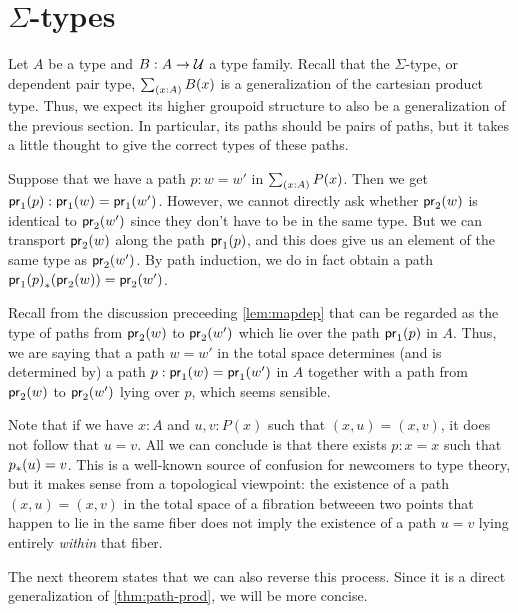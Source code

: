 \section{\texorpdfstring{$\Sigma$}{Σ}-types}
\label{sec:compute-sigma}

Let $A$ be a type and $B:A\to\mathcal{U}$ a type family.
Recall that the $\Sigma$-type, or dependent pair type, $\sm{x:A} B(x)$ is a generalization of the cartesian product type.
Thus, we expect its higher groupoid structure to also be a generalization of the previous section.
In particular, its paths should be pairs of paths, but it takes a little thought to give the correct types of these paths.

Suppose that we have a path $p:w=w'$ in $\sm{x:A}P(x)$.
Then we get ${\mathsf{pr}_{1}}\mathopen{}\left({p}\right)\mathclose{}:\mathsf{pr}_{1}(w)=\mathsf{pr}_{1}(w')$.
However, we cannot directly ask whether $\mathsf{pr}_{2}(w)$ is identical to $\mathsf{pr}_{2}(w')$ since they don't have to be in the same type.
But we can transport $\mathsf{pr}_{2}(w)$ along the path ${\mathsf{pr}_{1}}\mathopen{}\left({p}\right)\mathclose{}$, and this does give us an element of the same type as $\mathsf{pr}_{2}(w')$.
By path induction, we do in fact obtain a path ${{\mathsf{pr}_{1}}\mathopen{}\left({p}\right)\mathclose{}}_{*}\mathopen{}\left({\mathsf{pr}_{2}(w)}\right)\mathclose{}=\mathsf{pr}_{2}(w')$.

Recall from the discussion preceeding \autoref{lem:mapdep} that
can be regarded as the type of paths from $\mathsf{pr}_{2}(w)$ to $\mathsf{pr}_{2}(w')$ which lie over the path ${\mathsf{pr}_{1}}\mathopen{}\left({p}\right)\mathclose{}$ in $A$.
Thus, we are saying that a path $w=w'$ in the total space determines (and is determined by) a path $p:\mathsf{pr}_{1}(w)=\mathsf{pr}_{1}(w')$ in $A$ together with a path from $\mathsf{pr}_{2}(w)$ to $\mathsf{pr}_{2}(w')$ lying over $p$, which seems sensible.

\begin{rmk}
  Note that if we have $x:A$ and $u,v:P(x)$ such that $(x,u)=(x,v)$, it does not follow that $u=v$.
  All we can conclude is that there exists $p:x=x$ such that ${p}_{*}\mathopen{}\left({u}\right)\mathclose{} = v$.
  This is a well-known source of confusion for newcomers to type theory, but it makes sense from a topological viewpoint: the existence of a path $(x,u)=(x,v)$ in the total space of a fibration betweeen two points that happen to lie in the same fiber does not imply the existence of a path $u=v$ lying entirely \emph{within} that fiber.
\end{rmk}

The next theorem states that we can also reverse this process.
Since it is a direct generalization of \autoref{thm:path-prod}, we will be more concise.

